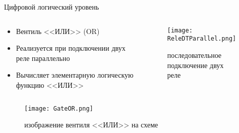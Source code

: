 \documentclass[aspectratio=169,14pt]{beamer}
\begin{document}
\begin{frame}{Цифровой логический уровень}
    \begin{columns}[T,onlytextwidth]
        \begin{column}{0.5\textwidth}
            \begin{itemize}
                \item Вентиль <<ИЛИ>> (OR)
                \item Реализуется при подключении двух реле параллельно
                \item Вычисляет элементарную логическую функцию <<ИЛИ>>
            \end{itemize}
        \end{column}
        \begin{column}{0.5\textwidth}
            \begin{figure}[htp]
                \centering
                \texttt{[image: ReleDTParallel.png]}
                \caption{\tiny{последовательное подключение двух реле}}
                \label{fig:ReleDTParallel}
            \end{figure}
        \end{column}
    \end{columns}
    \begin{figure}[htp]
        \centering
        \texttt{[image: GateOR.png]}
        \caption{\tiny{изображение вентиля <<ИЛИ>> на схеме}}
        \label{fig:GateOR}
    \end{figure}
\end{frame}
\end{document}
